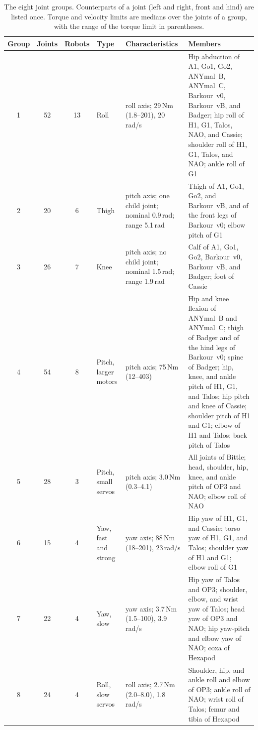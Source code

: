 \begin{table}[t]
\centering
\footnotesize
\setlength{\tabcolsep}{4pt}
\renewcommand{\arraystretch}{1.15}
\caption{The eight joint groups. Counterparts of a joint (left and right, front and hind) are listed once. Torque and
velocity limits are medians over the joints of a group, with the range of the torque limit in parentheses.}
\label{tab:groups}
\begin{tabular}{cccl p{3.3cm} p{6.5cm}}
\toprule
Group & Joints & Robots & Type & Characteristics & Members \\
\midrule
1 & 52 & 13 & Roll & \raggedright roll axis; 29\,Nm (1.8--201), 20\,rad/s &
Hip abduction of A1, Go1, Go2, ANYmal~B, ANYmal~C, Barkour~v0, Barkour~vB, and Badger; hip roll of H1, G1, Talos,
NAO, and Cassie; shoulder roll of H1, G1, Talos, and NAO; ankle roll of G1 \\
2 & 20 & 6 & Thigh & \raggedright pitch axis; one child joint; nominal 0.9\,rad; range 5.1\,rad &
Thigh of A1, Go1, Go2, and Barkour~vB, and of the front legs of Barkour~v0; elbow pitch of G1 \\
3 & 26 & 7 & Knee & \raggedright pitch axis; no child joint; nominal 1.5\,rad; range 1.9\,rad &
Calf of A1, Go1, Go2, Barkour~v0, Barkour~vB, and Badger; foot of Cassie \\
4 & 54 & 8 & Pitch, larger motors & \raggedright pitch axis; 75\,Nm (12--403) &
Hip and knee flexion of ANYmal~B and ANYmal~C; thigh of Badger and of the hind legs of Barkour~v0; spine of Badger;
hip, knee, and ankle pitch of H1, G1, and Talos; hip pitch and knee of Cassie; shoulder pitch of H1 and G1; elbow of
H1 and Talos; back pitch of Talos \\
5 & 28 & 3 & Pitch, small servos & \raggedright pitch axis; 3.0\,Nm (0.3--4.1) &
All joints of Bittle; head, shoulder, hip, knee, and ankle pitch of OP3 and NAO; elbow roll of NAO \\
6 & 15 & 4 & Yaw, fast and strong & \raggedright yaw axis; 88\,Nm (18--201), 23\,rad/s &
Hip yaw of H1, G1, and Cassie; torso yaw of H1, G1, and Talos; shoulder yaw of H1 and G1; elbow roll of G1 \\
7 & 22 & 4 & Yaw, slow & \raggedright yaw axis; 3.7\,Nm (1.5--100), 3.9\,rad/s &
Hip yaw of Talos and OP3; shoulder, elbow, and wrist yaw of Talos; head yaw of OP3 and NAO; hip yaw-pitch and elbow
yaw of NAO; coxa of Hexapod \\
8 & 24 & 4 & Roll, slow servos & \raggedright roll axis; 2.7\,Nm (2.0--8.0), 1.8\,rad/s &
Shoulder, hip, and ankle roll and elbow of OP3; ankle roll of NAO; wrist roll of Talos; femur and tibia of Hexapod \\
\bottomrule
\end{tabular}
\end{table}

